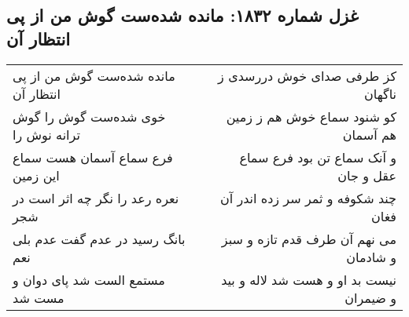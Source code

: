 \begin{center}
\section*{غزل شماره ۱۸۳۲: مانده شده‌ست گوش من از پی انتظار آن}
\label{sec:1832}
\begin{longtable}{l p{0.5cm} r}
مانده شده‌ست گوش من از پی انتظار آن
&&
کز طرفی صدای خوش دررسدی ز ناگهان
\\
خوی شده‌ست گوش را گوش ترانه نوش را
&&
کو شنود سماع خوش هم ز زمین هم آسمان
\\
فرع سماع آسمان هست سماع این زمین
&&
و آنک سماع تن بود فرع سماع عقل و جان
\\
نعره رعد را نگر چه اثر است در شجر
&&
چند شکوفه و ثمر سر زده اندر آن فغان
\\
بانگ رسید در عدم گفت عدم بلی نعم
&&
می نهم آن طرف قدم تازه و سبز و شادمان
\\
مستمع الست شد پای دوان و مست شد
&&
نیست بد او و هست شد لاله و بید و ضیمران
\\
\end{longtable}
\end{center}
